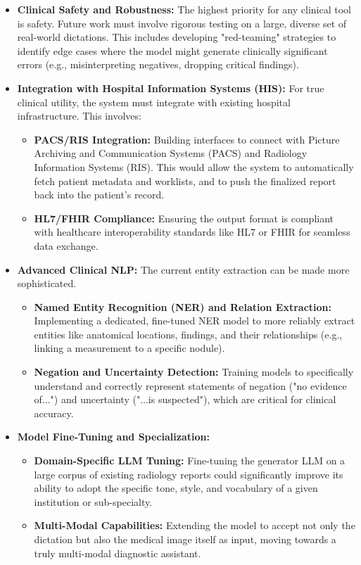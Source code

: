 \begin{itemize}
    \item \textbf{Clinical Safety and Robustness:} The highest priority for any clinical tool is safety. Future work must involve rigorous testing on a large, diverse set of real-world dictations. This includes developing "red-teaming" strategies to identify edge cases where the model might generate clinically significant errors (e.g., misinterpreting negatives, dropping critical findings).
    
    \item \textbf{Integration with Hospital Information Systems (HIS):} For true clinical utility, the system must integrate with existing hospital infrastructure. This involves:
        \begin{itemize}
            \item \textbf{PACS/RIS Integration:} Building interfaces to connect with Picture Archiving and Communication Systems (PACS) and Radiology Information Systems (RIS). This would allow the system to automatically fetch patient metadata and worklists, and to push the finalized report back into the patient's record.
            \item \textbf{HL7/FHIR Compliance:} Ensuring the output format is compliant with healthcare interoperability standards like HL7 or FHIR for seamless data exchange.
        \end{itemize}

    \item \textbf{Advanced Clinical NLP:} The current entity extraction can be made more sophisticated.
        \begin{itemize}
            \item \textbf{Named Entity Recognition (NER) and Relation Extraction:} Implementing a dedicated, fine-tuned NER model to more reliably extract entities like anatomical locations, findings, and their relationships (e.g., linking a measurement to a specific nodule).
            \item \textbf{Negation and Uncertainty Detection:} Training models to specifically understand and correctly represent statements of negation ("no evidence of...") and uncertainty ("...is suspected"), which are critical for clinical accuracy.
        \end{itemize}

    \item \textbf{Model Fine-Tuning and Specialization:}
        \begin{itemize}
            \item \textbf{Domain-Specific LLM Tuning:} Fine-tuning the generator LLM on a large corpus of existing radiology reports could significantly improve its ability to adopt the specific tone, style, and vocabulary of a given institution or sub-specialty.
            \item \textbf{Multi-Modal Capabilities:} Extending the model to accept not only the dictation but also the medical image itself as input, moving towards a truly multi-modal diagnostic assistant.
        \end{itemize}
        

\end{itemize}
